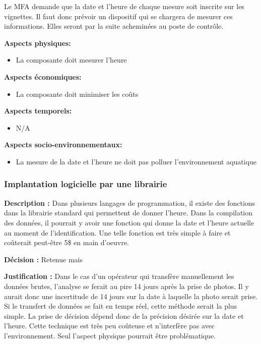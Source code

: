 Le MFA demande que la date et l'heure de chaque mesure soit inscrite sur les vignettes. Il faut donc prévoir un dispositif qui se chargera de mesurer ces informations. Elles seront par la suite acheminées au poste de contrôle. 

\textbf{Aspects physiques:}
\begin{itemize}[label = {--}]
    \item La composante doit mesurer l'heure
\end{itemize}

\textbf{Aspects économiques:}
\begin{itemize}[label = {--}]
    \item La composante doit minimiser les coûts
\end{itemize}

\textbf{Aspects temporels:}
\begin{itemize}[label = {--}]
    \item N/A
\end{itemize}

\textbf{Aspects socio-environnementaux:}
\begin{itemize}[label = {--}]
    \item La mesure de la date et l'heure ne doit pas polluer l'environnement aquatique
\end{itemize}

\subsubsection{Implantation logicielle par une librairie}

\textbf{Description :} Dans plusieurs langages de programmation, il existe des fonctions dans la librairie standard qui permettent de donner l'heure. Dans la compilation des données, il pourrait y avoir une fonction qui donne la date et l'heure actuelle au moment de l'identification. Une telle fonction est très simple à faire et coûterait peut-être 5\$ en main d'oeuvre.

\textbf{Décision :} Retenue mais

\textbf{Justification :} Dans le cas d'un opérateur qui transfère manuellement les données brutes, l'analyse se ferait au pire 14 jours après la prise de photos. Il y aurait donc une incertitude de 14 jours sur la date à laquelle la photo serait prise. Si le transfert de données se fait en temps réel, cette méthode serait la plus simple. La prise de décision dépend donc de la précision désirée sur la date et l'heure. Cette technique est très peu coûteuse et n'interfère pas avec l'environnement. Seul l'aspect physique pourrait être problématique.


